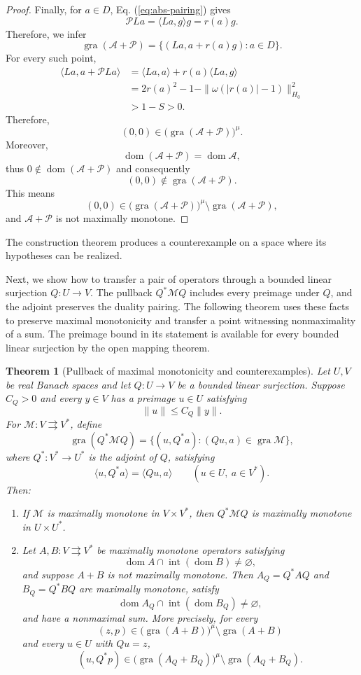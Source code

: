 \documentclass[11pt]{article}
\newcommand{\gra}{\operatorname{gra}}
\newcommand{\dom}{\operatorname{dom}}
\newcommand{\pair}[2]{\langle #1,#2\rangle}
\newtheorem{theorem}{Theorem}
\theoremstyle{definition}
\theoremstyle{remark}
\begin{document}
\begin{proof}
Finally, for $a\in D$, Eq. (\ref{eq:abs-pairing}) gives
\[
\mathcal PLa
=
\pair{La}{g}g
=
r(a)g.
\]
Therefore, we infer 
\[
\gra(\mathcal A+\mathcal P)
=
\{(La,a+r(a)g):a\in D\}.
\]
For every such point,
\[
\begin{aligned}
\pair{La}{a+\mathcal PLa}
&=\pair{La}{a}+r(a)\pair{La}{g}\\
&=2r(a)^2-1-\|\omega(|r(a)|-1)\|_{H_0}^2\\
&>1-S>0.
\end{aligned}
\]
Therefore,
\[
(0,0)\in
\bigl(\gra(\mathcal A+\mathcal P)\bigr)^\mu.
\]
Moreover,
\[
\dom(\mathcal A+\mathcal P)
=
\dom\mathcal A,
\]
thus $0\notin\dom(\mathcal A+\mathcal P)$ and consequently
\[
(0,0)\notin\gra(\mathcal A+\mathcal P).
\]
This means
\[
(0,0)\in
\bigl(\gra(\mathcal A+\mathcal P)\bigr)^\mu
\setminus
\gra(\mathcal A+\mathcal P),
\]
and $\mathcal A+\mathcal P$ is not maximally monotone.
\end{proof}

The construction theorem produces a counterexample on a space where its hypotheses can be realized. 


Next, we show how to transfer a pair of operators through a bounded linear surjection $Q:U\to V$. The pullback $Q^*\mathcal M Q$ includes every preimage under $Q$, and the adjoint preserves the duality pairing. The following theorem uses these facts to preserve maximal monotonicity and transfer a point witnessing nonmaximality of a sum. The preimage bound in its statement is available for every bounded linear surjection by the open mapping theorem.

\begin{theorem}[Pullback of maximal monotonicity and counterexamples]
\label{lem:surjection-transport}
Let $U,V$ be real Banach spaces and let $Q:U\to V$ be a bounded linear surjection. Suppose $C_Q>0$ and every $y\in V$ has a preimage $u\in U$ satisfying
\[
\|u\|\le C_Q\|y\|.
\]
For $\mathcal M:V\rightrightarrows V^*$, define
\[
\gra(Q^*\mathcal M Q)
=
\{(u,Q^*a):(Qu,a)\in\gra\mathcal M\},
\]
where $Q^*:V^*\to U^*$ is the adjoint of $Q$, satisfying
\[
\pair{u}{Q^*a}=\pair{Qu}{a}
\qquad(u\in U,\ a\in V^*).
\]
Then:
\begin{enumerate}
\item\label{thm:pullback-maximality} If $\mathcal M$ is maximally monotone in $V\times V^*$, then $Q^*\mathcal M Q$ is maximally monotone in $U\times U^*$.
\item\label{thm:pullback-counterexamples} Let $A,B:V\rightrightarrows V^*$ be maximally monotone operators satisfying
\[
\dom A\cap\operatorname{int}(\dom B)\ne\varnothing,
\]
and suppose $A+B$ is not maximally monotone. Then $A_Q=Q^*AQ$ and $B_Q=Q^*BQ$ are maximally monotone, satisfy
\[
\dom A_Q\cap\operatorname{int}(\dom B_Q)\ne\varnothing,
\]
and have a nonmaximal sum. More precisely, for every
\[
(z,p)\in\bigl(\gra(A+B)\bigr)^\mu\setminus\gra(A+B)
\]
and every $u\in U$ with $Qu=z$,
\begin{equation}
(u,Q^*p)\in\bigl(\gra(A_Q+B_Q)\bigr)^\mu\setminus\gra(A_Q+B_Q).
\label{eq:pullback-witness}
\end{equation}
\end{enumerate}
\end{theorem}
\end{document}
